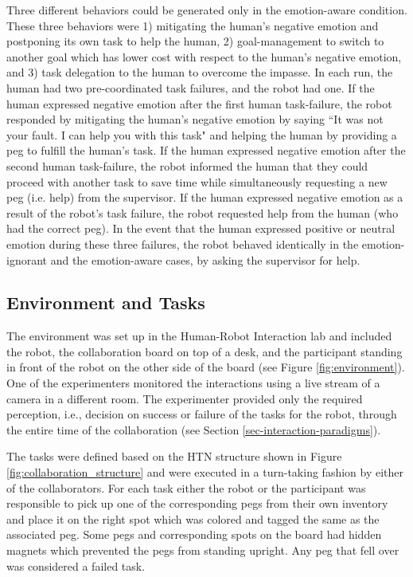 \documentclass[12pt]{report}
\begin{document}
Three different behaviors could be generated only in the emotion-aware
condition. These three behaviors were 1) mitigating the human's negative emotion
and postponing its own task to help the human, 2) goal-management to switch to
another goal which has lower cost with respect to the human's negative emotion,
and 3) task delegation to the human to overcome the impasse. In each run, the
human had two pre-coordinated task failures, and the robot had one. If the human
expressed negative emotion after the first human task-failure, the robot
responded by mitigating the human's negative emotion by saying  ``It was not
your fault. I can help you with this task" and helping the human by providing a
peg to fulfill the human's task. If the human expressed negative emotion after
the second human task-failure, the robot informed the human that they could
proceed with another task to save time while simultaneously requesting a new peg
(i.e. help) from the supervisor. If the human expressed negative emotion as a
result of the robot's task failure, the robot requested help from the human (who
had the correct peg). In the event that the human expressed positive or neutral
emotion during these three failures, the robot behaved identically in the
emotion-ignorant and the emotion-aware cases, by asking the supervisor for help. 

\subsection{Environment and Tasks}

The environment was set up in the Human-Robot Interaction lab and included the
robot, the collaboration board on top of a desk, and the participant standing in
front of the robot on the other side of the board (see Figure
\ref{fig:environment}). One of the experimenters monitored the interactions
using a live stream of a camera in a different room. The experimenter provided
only the required perception, i.e., decision on success or failure of the tasks
for the robot, through the entire time of the collaboration (see Section
\ref{sec-interaction-paradigms}).

The tasks were defined based on the HTN structure shown in Figure
\ref{fig:collaboration_structure} and were executed in a turn-taking fashion by
either of the collaborators. For each task either the robot or the participant
was responsible to pick up one of the corresponding pegs from their own
inventory and place it on the right spot which was colored and tagged the same
as the associated peg. Some pegs and corresponding spots on the board had hidden
magnets which prevented the pegs from standing upright. Any peg that fell over
was considered a failed task.
\end{document}
